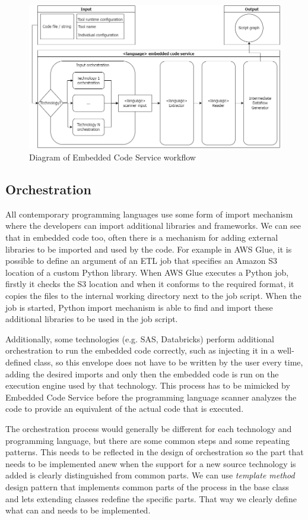 \begin{figure}[ht]\centering
\includegraphics[width=1.0\textwidth]{img/Embedded code service base design.png}
\caption{Diagram of Embedded Code Service workflow}
\label{fig:ECSbasedesign}
\end{figure}   

\subsection{Orchestration}

All contemporary programming languages use some form of import mechanism where the developers can import additional libraries and frameworks. We can see that in embedded code too, often there is a mechanism for adding external libraries to be imported and used by the code. For example in AWS Glue, it is possible to define an argument of an ETL job that specifies an Amazon S3 location of a custom Python library. When AWS Glue executes a Python job, firstly it checks the S3 location and when it conforms to the required format, it copies the files to the internal working directory next to the job script. When the job is started, Python import mechanism is able to find and import these additional libraries to be used in the job script.
\par
Additionally, some technologies (e.g. SAS, Databricks) perform additional orchestration to run the embedded code correctly, such as injecting it in a well-defined class, so this envelope does not have to be written by the user every time, adding the desired imports and only then the embedded code is run on the execution engine used by that technology. This process has to be mimicked by Embedded Code Service before the programming language scanner analyzes the code to provide an equivalent of the actual code that is executed.
\par
The orchestration process would generally be different for each technology and programming language, but there are some common steps and some repeating patterns. This needs to be reflected in the design of orchestration so the part that needs to be implemented anew when the support for a new source technology is added is clearly distinguished from common parts. We can use \textit{template method} design pattern that implements common parts of the process in the base class and lets extending classes redefine the specific parts. That way we clearly define what can and needs to be implemented.


